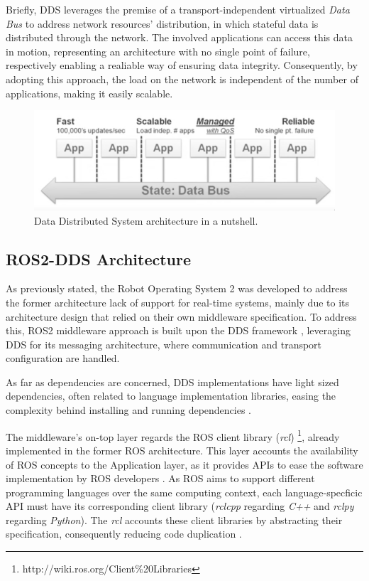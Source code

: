 Briefly, DDS leverages the premise of a transport-independent virtualized \textit{Data Bus} to address network resources' distribution, in which stateful data is distributed through the network. The involved applications can access this data in motion, representing an architecture with no single point of failure, respectively enabling a realiable way of ensuring data integrity. Consequently, by adopting this approach, the load on the network is independent of the number of applications, making it easily scalable.

\begin{figure}[H]
    \centering
    \includegraphics[width=0.6\linewidth]{img/dds-architecture.png}
    \caption{Data Distributed System architecture in a nutshell.}
    \label{fig:dds-architecture-nutshell}
\end{figure}


\subsection{ROS2-DDS Architecture}

As previously stated, the Robot Operating System 2 was developed to address the former architecture lack of support for real-time systems, mainly due to its architecture design that relied on their own middleware specification. To address this, ROS2 middleware approach is built upon the DDS framework \cite{maruyama2016exploring}, leveraging DDS for its messaging architecture, where communication and transport configuration are handled. 

As far as dependencies are concerned, DDS implementations have light sized dependencies, often related to language implementation libraries, easing the complexity behind installing and running dependencies \cite{ros-on-dds}.

The middleware's on-top layer regards the ROS client library (\textit{rcl}) \footnote{http://wiki.ros.org/Client\%20Libraries}, already implemented in the former ROS architecture. This layer accounts the availability of ROS concepts to the Application layer, as it provides APIs to ease the software implementation by ROS developers \cite{ros2documentation}. As ROS aims to support different programming languages over the same computing context, each language-specficic API must have its corresponding client library (\textit{rclcpp} regarding \textit{C++} and \textit{rclpy} regarding \textit{Python}). The \textit{rcl} accounts these client libraries by abstracting their specification, consequently reducing code duplication \cite{rcl, casini2019response}.

